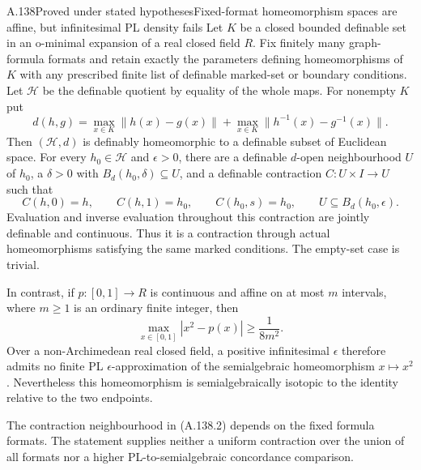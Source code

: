 \begin{saresult}{A.138}{Proved under stated hypotheses}{Fixed-format homeomorphism spaces are affine, but infinitesimal PL density fails}
Let $K$ be a closed bounded definable set in an o-minimal expansion
of a real closed field $R$. Fix finitely many graph-formula formats
and retain exactly the parameters defining homeomorphisms of $K$
with any prescribed finite list of definable marked-set or boundary
conditions. Let $\mathcal H$ be the definable quotient by equality
of the whole maps. For nonempty $K$ put
\[
 d(h,g)=\max_{x\in K}\|h(x)-g(x)\|
       +\max_{x\in K}\|h^{-1}(x)-g^{-1}(x)\|.
                                                        \tag{A.138.1}
\]
Then $(\mathcal H,d)$ is definably homeomorphic to a definable
subset of Euclidean space. For every $h_0\in\mathcal H$ and
$\epsilon>0$, there are a definable $d$-open neighbourhood $U$
of $h_0$, a $\delta>0$ with $B_d(h_0,\delta)\subseteq U$, and
a definable contraction $C:U\times I\to U$ such that
\[
 C(h,0)=h,\qquad C(h,1)=h_0,\qquad C(h_0,s)=h_0,
 \qquad U\subseteq B_d(h_0,\epsilon).                 \tag{A.138.2}
\]
Evaluation and inverse evaluation throughout this contraction are
jointly definable and continuous. Thus it is a contraction through
actual homeomorphisms satisfying the same marked conditions.
The empty-set case is trivial.

In contrast, if $p:[0,1]\to R$ is continuous and affine on at most
$m$ intervals, where $m\ge1$ is an ordinary finite integer, then
\[
 \max_{x\in[0,1]}|x^2-p(x)|\ge\frac1{8m^2}.           \tag{A.138.3}
\]
Over a non-Archimedean real closed field, a positive infinitesimal
$\epsilon$ therefore admits no finite PL $\epsilon$-approximation
of the semialgebraic homeomorphism $x\mapsto x^2$.
Nevertheless this homeomorphism is semialgebraically isotopic to
the identity relative to the two endpoints.

The contraction neighbourhood in (A.138.2) depends on the fixed
formula formats. The statement supplies neither a uniform
contraction over the union of all formats nor a higher
PL-to-semialgebraic concordance comparison.
\end{saresult}
